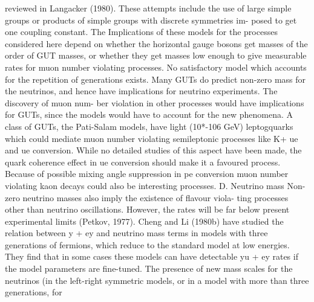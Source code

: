 \documentclass[twoside]{article}
\begin{document}
{{{{{{{{{{{{{{{{reviewed in Langacker (1980). These attempts include the use of large
simple groups or products of simple groups with discrete symmetries im-
posed to get one coupling constant. The Implications of these models
for the processes considered here depend on whether the horizontal gauge
bosons get masses of the order of GUT masses, or whether they get masses
low enough to give measurable rates for muon number violating processes.
No satisfactory model which accounts for the repetition of generations
exists. Many GUTs do predict non-zero mass for the neutrinos, and hence
have implications for neutrino experiments. The discovery of muon num-
ber violation in other processes would have implications for GUTs, since
the models would have to account for the new phenomena. A class of GUTs,
the Pati-Salam models, have light (10*-106 GeV) leptogquarks which could
mediate muon number violating semileptonic processes like K+ ue and
ue conversion. While no detailed studies of this aspect have been made,
the quark coherence effect in ue conversion should make it a favoured
process. Because of possible mixing angle suppression in pe conversion
muon number violating kaon decays could also be interesting processes.
D. Neutrino mass
Non-zero neutrino masses also imply the existence of flavour viola-
ting processes other than neutrino oscillations. However, the rates will be far
below present experimental limits (Petkov, 1977). Cheng and Li (1980b)
have studied the relation between y + ey and neutrino mass terms in
models with three generations of fermions, which reduce to the standard
model at low energies. They find that in some cases these models can
have detectable yu + ey rates if the model parameters are fine-tuned.
The presence of new mass scales for the neutrinos (in the left-right
symmetric models, or in a model with more than three generations, for

}}}}}}}}}}}}}}}}
\end{document}
